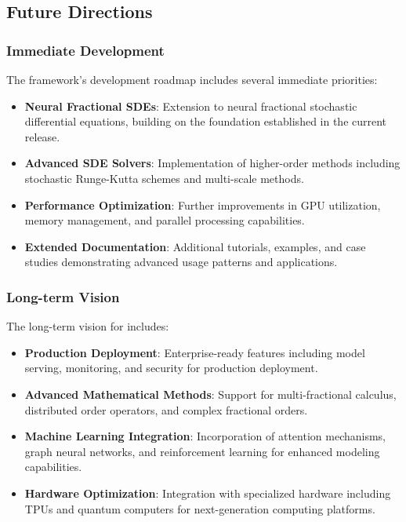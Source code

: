 \subsection{Future Directions}

\subsubsection{Immediate Development}

The framework's development roadmap includes several immediate priorities:

\begin{itemize}
    \item \textbf{Neural Fractional SDEs}: Extension to neural fractional stochastic differential equations, building on the foundation established in the current release.
    
    \item \textbf{Advanced SDE Solvers}: Implementation of higher-order methods including stochastic Runge-Kutta schemes and multi-scale methods.
    
    \item \textbf{Performance Optimization}: Further improvements in GPU utilization, memory management, and parallel processing capabilities.
    
    \item \textbf{Extended Documentation}: Additional tutorials, examples, and case studies demonstrating advanced usage patterns and applications.
\end{itemize}

\subsubsection{Long-term Vision}

The long-term vision for \hpfracc includes:

\begin{itemize}
    \item \textbf{Production Deployment}: Enterprise-ready features including model serving, monitoring, and security for production deployment.
    
    \item \textbf{Advanced Mathematical Methods}: Support for multi-fractional calculus, distributed order operators, and complex fractional orders.
    
    \item \textbf{Machine Learning Integration}: Incorporation of attention mechanisms, graph neural networks, and reinforcement learning for enhanced modeling capabilities.
    
    \item \textbf{Hardware Optimization}: Integration with specialized hardware including TPUs and quantum computers for next-generation computing platforms.
\end{itemize}

